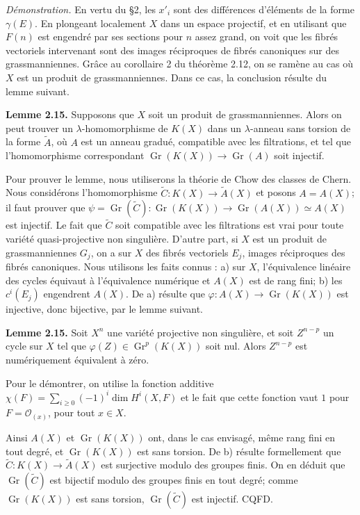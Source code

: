 \documentclass[11pt]{article}
\newcommand{\Gr}{\operatorname{Gr}}
\providecommand{\Gr}{\operatorname{Gr}}
\providecommand{\Atil}{\widetilde A}
\providecommand{\Ctil}{\widetilde C}
\providecommand{\Gr}{\operatorname{G}}
\providecommand{\cO}{\mathcal O}
\begin{document}
\emph{Démonstration.} En vertu du \S 2, les $x'_i$ sont des différences d'éléments de la forme $\gamma(E)$. En plongeant localement $X$ dans un espace projectif, et en utilisant que $F(n)$ est engendré par ses sections pour $n$ assez grand, on voit que les fibrés vectoriels intervenant sont des images réciproques de fibrés canoniques sur des grassmanniennes. Grâce au corollaire 2 du théorème 2.12, on se ramène au cas où $X$ est un produit de grassmanniennes. Dans ce cas, la conclusion résulte du lemme suivant.

\textbf{Lemme 2.15.} Supposons que $X$ soit un produit de grassmanniennes. Alors on peut trouver un $\lambda$-homomorphisme de $K(X)$ dans un $\lambda$-anneau sans torsion de la forme $\Atil$, où $A$ est un anneau gradué, compatible avec les filtrations, et tel que l'homomorphisme correspondant $\Gr(K(X))\to\Gr(A)$ soit injectif.

Pour prouver le lemme, nous utiliserons la théorie de Chow des classes de Chern. Nous considérons l'homomorphisme $\Ctil:K(X)\to\Atil(X)$ et posons $A=A(X)$; il faut prouver que $\psi=\Gr(\Ctil):\Gr(K(X))\to\Gr(A(X))\simeq A(X)$ est injectif. Le fait que $\Ctil$ soit compatible avec les filtrations est vrai pour toute variété quasi-projective non singulière. D'autre part, si $X$ est un produit de grassmanniennes $G_j$, on a sur $X$ des fibrés vectoriels $E_j$, images réciproques des fibrés canoniques. Nous utilisons les faits connus : a) sur $X$, l'équivalence linéaire des cycles équivaut à l'équivalence numérique et $A(X)$ est de rang fini; b) les $c^i(E_j)$ engendrent $A(X)$. De a) résulte que $\varphi:A(X)\to\Gr(K(X))$ est injective, donc bijective, par le lemme suivant.

\textbf{Lemme 2.15.} Soit $X^n$ une variété projective non singulière, et soit $Z^{n-p}$ un cycle sur $X$ tel que $\varphi(Z)\in\Gr^p(K(X))$ soit nul. Alors $Z^{n-p}$ est numériquement équivalent à zéro.

Pour le démontrer, on utilise la fonction additive $\chi(F)=\sum_{i\geq0}(-1)^i\dim H^i(X,F)$ et le fait que cette fonction vaut $1$ pour $F=\cO_{(x)}$, pour tout $x\in X$.

Ainsi $A(X)$ et $\Gr(K(X))$ ont, dans le cas envisagé, même rang fini en tout degré, et $\Gr(K(X))$ est sans torsion. De b) résulte formellement que $\Ctil:K(X)\to\Atil(X)$ est surjective modulo des groupes finis. On en déduit que $\Gr(\Ctil)$ est bijectif modulo des groupes finis en tout degré; comme $\Gr(K(X))$ est sans torsion, $\Gr(\Ctil)$ est injectif. CQFD.
\end{document}
